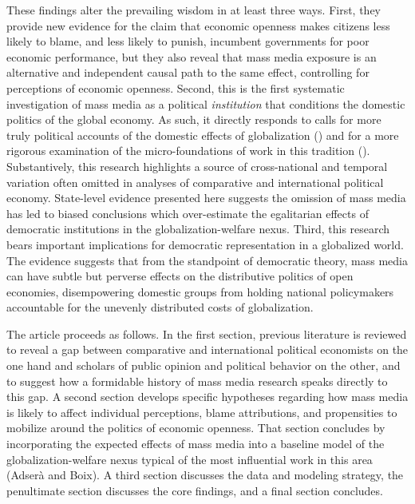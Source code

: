 \documentclass[12pt]{report}
\begin{document}
These findings alter the prevailing wisdom in at least three ways. First, they provide new evidence
for the claim that economic openness makes citizens less likely to blame, and less likely to punish,
incumbent governments for poor economic performance, but they also reveal that mass media exposure
is an alternative and independent causal path to the same effect, controlling for perceptions of
economic openness. Second, this is the first systematic investigation of mass media as a political
\emph{institution} that conditions the domestic politics of the global economy. As such, it directly
responds to calls for more truly political accounts of the domestic effects of globalization
(\citealt[341]{Kayser:2007iga}) and for a more rigorous examination of the micro-foundations of work
in this tradition (\citealt[474]{Hays:2005vo}). Substantively, this research highlights a source of
cross-national and temporal variation often omitted in analyses of comparative and international
political economy. State-level evidence presented here suggests the omission of mass media has led
to biased conclusions which over-estimate the egalitarian effects of democratic institutions in the
globalization-welfare nexus. Third, this research bears important implications for democratic
representation in a globalized world. The evidence suggests that from the standpoint of democratic
theory, mass media can have subtle but perverse effects on the distributive politics of open
economies, disempowering domestic groups from holding national policymakers accountable for the
unevenly distributed costs of globalization.

The article proceeds as follows. In the first section, previous literature is reviewed to reveal a
gap between comparative and international political economists on the one hand and scholars of
public opinion and political behavior on the other, and to suggest how a formidable history of mass
media research speaks directly to this gap. A second section develops specific hypotheses regarding
how mass media is likely to affect individual perceptions, blame attributions, and propensities to
mobilize around the politics of economic openness. That section concludes by incorporating the
expected effects of mass media into a baseline model of the globalization-welfare nexus typical of
the most influential work in this area (Adser\`{a} and Boix\citeyear{Adsera:2002vt}). A third
section discusses the data and modeling strategy, the penultimate section discusses the core
findings, and a final section concludes.
\end{document}
